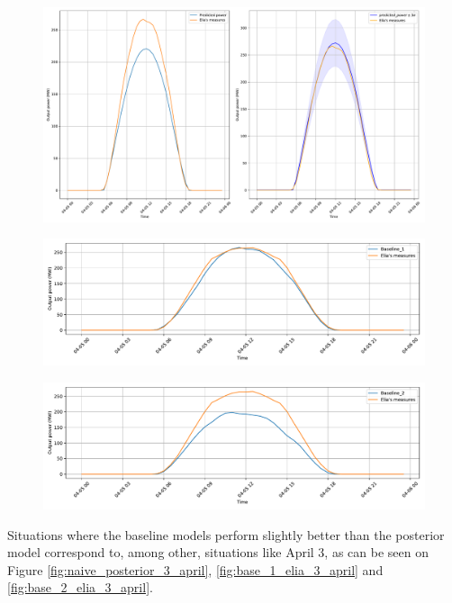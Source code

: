\documentclass[a4paper, 12pt]{article}
\begin{document}
\begin{figure}[H]
    \centering
    \includegraphics[width=\textwidth]{resources/pdf/comparison_naive_posterior_29-03-2020.pdf}
    \label{fig:naive_posterior_5_april}
\end{figure}
\begin{figure}[H]
    \centering
    \includegraphics[width=\textwidth]{resources/pdf/baseline_1_29-03-2020.pdf}
    \label{fig:base_1_elia_5_april}
\end{figure}
\begin{figure}[H]
    \centering
    \includegraphics[width=\textwidth]{resources/pdf/baseline_2_29-03-2020.pdf}
    \label{fig:base_2_elia_5_april}
\end{figure}
Situations where the baseline models perform slightly better than the posterior model correspond to, among other, situations like April 3, as can be seen on Figure \ref{fig:naive_posterior_3_april}, \ref{fig:base_1_elia_3_april} and \ref{fig:base_2_elia_3_april}.
\end{document}
